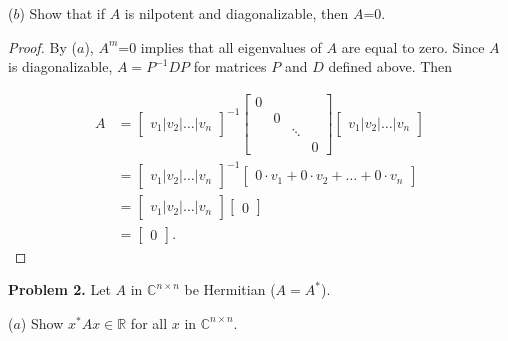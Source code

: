 \documentclass[12pt]{article}
\begin{document}
\vspace{.2cm}

($b$) Show that if $A$ is nilpotent and diagonalizable, then $A$=0.

\vspace{.2cm}

\begin{proof} By ($a$), $A^{m}$=0 implies that all eigenvalues of $A$ are equal to zero. Since $A$ is diagonalizable, $A=P^{-1}DP$ for matrices $P$ and $D$ defined above. Then

\begin{align*}
A&= 
\begin{bmatrix}
	v_{1} | v_{2} | \dots | v_{n} 
\end{bmatrix}^{-1}
\begin{bmatrix}
		0 & & & \\
		& 0 & & \\
		& & \ddots & \\
		& & & 0
\end{bmatrix}
\begin{bmatrix}
	v_{1} | v_{2} | \dots | v_{n} 
\end{bmatrix} \\
&=
\begin{bmatrix}
	v_{1} | v_{2} | \dots | v_{n} 
\end{bmatrix}^{-1}
\begin{bmatrix}
	0 \cdot v_{1} + 0 \cdot v_{2} + \dots + 0 \cdot v_{n}
\end{bmatrix} \\
&=
\begin{bmatrix}
	v_{1} | v_{2} | \dots | v_{n} 
\end{bmatrix}
\begin{bmatrix}
	0
\end{bmatrix} \\
&=
\begin{bmatrix}
	0
\end{bmatrix}.
\end{align*}
\end{proof}

\textbf{Problem 2.} Let $A$ in $\mathbb{C}^{n \times n}$ be Hermitian ($A=A^{*}$). 

\vspace{.2cm}

($a$) Show $x^{*}Ax \in \mathbb{R}$ for all $x$ in $\mathbb{C}^{n \times n}$.

\vspace{.2cm}
\end{document}
